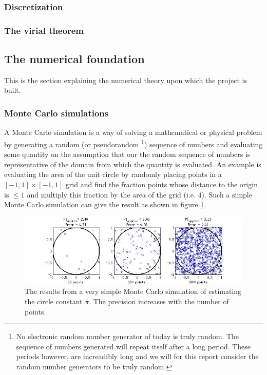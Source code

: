\subsubsection{Discretization}

\subsubsection{The virial theorem}


\subsection{The numerical foundation}
This is the section explaining the numerical theory upon which the project is built. 

\subsubsection{Monte Carlo simulations}
A Monte Carlo simulation is a way of solving a mathematical or physical problem by generating a random
(or pseudorandom
\footnote
{No electronic random number generator of today is truly random. 
The sequence of numbers generated will repeat itself after a long period. 
These periods however, are increadibly long and we will for this report 
consider the random number generators to be truly random.})
sequence of numbers and evaluating some quantity on the assumption that our the random sequence of numbers is representative of the domain from which the quantity is evaluated.
An example is evaluating the area of the unit circle by randomly placing points in a $[-1,1] \times [-1,1] $ grid and find the fraction points whose distance to the origin is $\leq 1$ and multiply this fraction by the area of the grid (i.e. $4$).
Such a simple Monte Carlo simulation can give the result as shown in figure \ref{fig:Monte_Carlo_Illustration}.

\begin{figure}[h!]
        \centering 
        \includegraphics[width=\textwidth]{Monte_Carlo_Illustration.jpg}
        \caption{The results from a very simple Monte Carlo simulation of 
        estimating the circle constant $\pi$. 
        The precision increases with the number of points.}
        \label{fig:Monte_Carlo_Illustration}
\end{figure}


